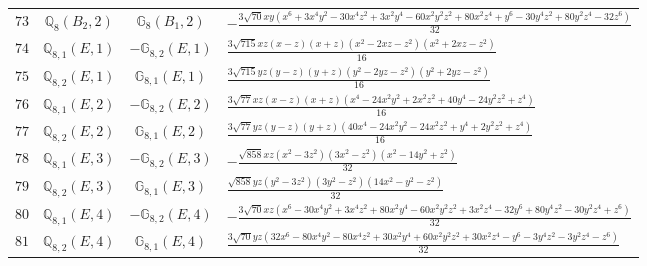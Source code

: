 \documentclass[fleqn,8pt,landscape]{jsarticle}
\begin{document}
\begin{table}[ht!]
\begin{center}
\begin{tabular}{cccl}
$ 73 $ & $ \mathbb{Q}_{8}(B_{2},2) $ & $ \mathbb{G}_{8}(B_{1},2) $ & $ - \frac{3 \sqrt{70} x y \left(x^{6} + 3 x^{4} y^{2} - 30 x^{4} z^{2} + 3 x^{2} y^{4} - 60 x^{2} y^{2} z^{2} + 80 x^{2} z^{4} + y^{6} - 30 y^{4} z^{2} + 80 y^{2} z^{4} - 32 z^{6}\right)}{32} $ \\
$ 74 $ & $ \mathbb{Q}_{8,1}(E,1) $ & $ -\mathbb{G}_{8,2}(E,1) $ & $ \frac{3 \sqrt{715} x z \left(x - z\right) \left(x + z\right) \left(x^{2} - 2 x z - z^{2}\right) \left(x^{2} + 2 x z - z^{2}\right)}{16} $ \\
$ 75 $ & $ \mathbb{Q}_{8,2}(E,1) $ & $ \mathbb{G}_{8,1}(E,1) $ & $ \frac{3 \sqrt{715} y z \left(y - z\right) \left(y + z\right) \left(y^{2} - 2 y z - z^{2}\right) \left(y^{2} + 2 y z - z^{2}\right)}{16} $ \\
$ 76 $ & $ \mathbb{Q}_{8,1}(E,2) $ & $ -\mathbb{G}_{8,2}(E,2) $ & $ \frac{3 \sqrt{77} x z \left(x - z\right) \left(x + z\right) \left(x^{4} - 24 x^{2} y^{2} + 2 x^{2} z^{2} + 40 y^{4} - 24 y^{2} z^{2} + z^{4}\right)}{16} $ \\
$ 77 $ & $ \mathbb{Q}_{8,2}(E,2) $ & $ \mathbb{G}_{8,1}(E,2) $ & $ \frac{3 \sqrt{77} y z \left(y - z\right) \left(y + z\right) \left(40 x^{4} - 24 x^{2} y^{2} - 24 x^{2} z^{2} + y^{4} + 2 y^{2} z^{2} + z^{4}\right)}{16} $ \\
$ 78 $ & $ \mathbb{Q}_{8,1}(E,3) $ & $ -\mathbb{G}_{8,2}(E,3) $ & $ - \frac{\sqrt{858} x z \left(x^{2} - 3 z^{2}\right) \left(3 x^{2} - z^{2}\right) \left(x^{2} - 14 y^{2} + z^{2}\right)}{32} $ \\
$ 79 $ & $ \mathbb{Q}_{8,2}(E,3) $ & $ \mathbb{G}_{8,1}(E,3) $ & $ \frac{\sqrt{858} y z \left(y^{2} - 3 z^{2}\right) \left(3 y^{2} - z^{2}\right) \left(14 x^{2} - y^{2} - z^{2}\right)}{32} $ \\
$ 80 $ & $ \mathbb{Q}_{8,1}(E,4) $ & $ -\mathbb{G}_{8,2}(E,4) $ & $ - \frac{3 \sqrt{70} x z \left(x^{6} - 30 x^{4} y^{2} + 3 x^{4} z^{2} + 80 x^{2} y^{4} - 60 x^{2} y^{2} z^{2} + 3 x^{2} z^{4} - 32 y^{6} + 80 y^{4} z^{2} - 30 y^{2} z^{4} + z^{6}\right)}{32} $ \\
$ 81 $ & $ \mathbb{Q}_{8,2}(E,4) $ & $ \mathbb{G}_{8,1}(E,4) $ & $ \frac{3 \sqrt{70} y z \left(32 x^{6} - 80 x^{4} y^{2} - 80 x^{4} z^{2} + 30 x^{2} y^{4} + 60 x^{2} y^{2} z^{2} + 30 x^{2} z^{4} - y^{6} - 3 y^{4} z^{2} - 3 y^{2} z^{4} - z^{6}\right)}{32} $ \\
 \hline \hline
\end{tabular}
\end{center}
\end{table}
\end{document}
